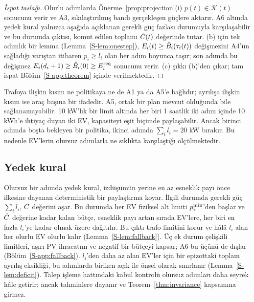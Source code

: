 \begin{proof}[İspat taslağı]
Olurlu adımlarda Önerme~\ref{prop:projection}(i) $p(t)\in\mathcal K(t)$ sonucunu verir ve A3, sıkılaştırılmış bandı gerçekleşen güçlere aktarır.
A6 altında yedek kural yalnızca aşağıda açıklanan gerekli güç fazlası durumuyla karşılaşabilir ve bu durumda çıktısı, komut edilen toplamı $\tilde C(t)$ değerinde tutar.
(b) için tek adımlık bir lemma (Lemma~\ref{S-lem:onestep}), $E_i(t)\ge\hat B_i(\tau_i(t))$ değişmezini A4'ün sağladığı varıştan itibaren $p_i\ge l_i$ olan her adım boyunca taşır; son adımda bu değişmez $E_i(d_i+1)\ge\hat B_i(0)\ge E^{\mathrm{req}}_i$ sonucunu verir.
(c) şıkkı (b)'den çıkar; tam ispat Bölüm~\ref{S-app:theorem} içinde verilmektedir.
\end{proof}

Trafoya ilişkin kısım ne politikaya ne de A1 ya da A5'e bağlıdır; ayrılışa ilişkin kısım ise araç başına bir ifadedir.
A5, ortak bir plan mevcut olduğunda bile sağlanamayabilir.
10 kW'lık bir limit altında her biri 1 saatlik iki adım içinde 10 kWh'e ihtiyaç duyan iki EV, kapasiteyi eşit biçimde paylaşabilir.
Ancak birinci adımda boşta bekleyen bir politika, ikinci adımda $\sum_il_i=20$ kW bırakır.
Bu nedenle EV'lerin olursuz adımlarla ne sıklıkta karşılaştığı ölçülmektedir.

\subsection{Yedek kural}\label{sec:fallback}

Olursuz bir adımda yedek kural, izdüşümün yerine en az esneklik payı önce ilkesine dayanan deterministik bir paylaştırma koyar.
İlgili durumda gerekli güç $\sum_il_i$, $\tilde C$ değerini aşar.
Bu durumda her EV fiziksel alt limiti $p^{\min}_i$'den başlar ve $\tilde C$ değerine kadar kalan bütçe, esneklik payı artan sırada EV'lere, her biri en fazla $l_i$'ye kadar olmak üzere dağıtılır.
Bu çıktı trafo limitini korur ve hâlâ $l_i$ alan her olurlu EV olurlu kalır (Lemma~\ref{S-lem:fallback}).
Üç ek durum çelişkili limitleri, aşırı PV ihracatını ve negatif bir bütçeyi kapsar; A6 bu üçünü de dışlar (Bölüm~\ref{S-app:fallback}).
$l_i$'den daha az alan EV'ler için bir epizottaki toplam ayrılış eksikliği, bu adımlarda biriken açık ile önsel olarak sınırlanır (Lemma~\ref{S-lem:deficit}).
Talep işleme hattındaki kabul kontrolü olursuz adımları daha seyrek hâle getirir; ancak tahminlere dayanır ve Teorem~\ref{thm:invariance} kapsamına girmez.

